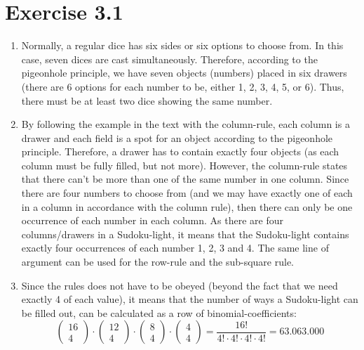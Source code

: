 \section{Exercise 3.1}
\renewcommand{\labelenumi}{\alph{enumi})}
\begin{enumerate}
\item
Normally, a regular dice has six sides or six options to choose from. In this case, seven dices are cast simultaneously. Therefore, according to the pigeonhole principle, we have seven objects (numbers) placed in six drawers (there are 6 options for each number to be, either 1, 2, 3, 4, 5, or 6). Thus, there must be at least two dice showing the same number. 

\item
By following the example in the text with the column-rule, each column is a drawer and each field is a spot for an object according to the pigeonhole principle. Therefore, a drawer has to contain exactly four objects (as each column must be fully filled, but not more). However, the column-rule states that there can't be more than one of the same number in one column. Since there are four numbers to choose from (and we may have exactly one of each in a column in accordance with the column rule), then there can only be one occurrence of each number in each column. As there are four columns/drawers in a Sudoku-light, it means that the Sudoku-light contains exactly four occurrences of each number 1, 2, 3 and 4. The same line of argument can be used for the row-rule and the sub-square rule.

\item
Since the rules does not have to be obeyed (beyond the fact that we need exactly 4 of each value), it means that the number of ways a Sudoku-light can be filled out, can be calculated as a row of binomial-coefficients:
\[ \begin{pmatrix} 16 \\ 4 \end{pmatrix} \cdot \begin{pmatrix} 12 \\ 4 \end{pmatrix} \cdot \begin{pmatrix} 8 \\ 4 \end{pmatrix} \cdot \begin{pmatrix} 4 \\ 4 \end{pmatrix} = \frac{16!}{4! \cdot 4! \cdot 4! \cdot 4!} = 63.063.000\]


\end{enumerate}
